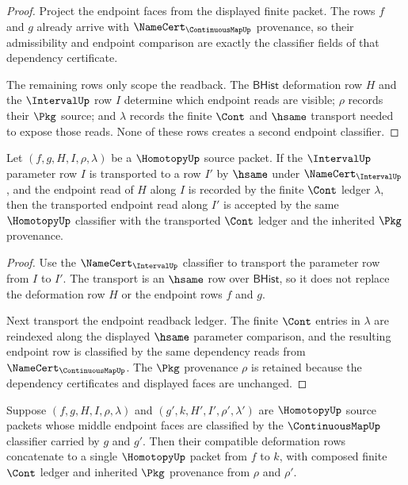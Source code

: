 \begin{proof}
Project the endpoint faces from the displayed finite packet. The rows $f$ and
$g$ already arrive with $\NameCert_{\ContinuousMapUp}$ provenance, so their
admissibility and endpoint comparison are exactly the classifier fields of
that dependency certificate.

The remaining rows only scope the readback. The $\mathsf{BHist}$ deformation
row $H$ and the $\IntervalUp$ row $I$ determine which endpoint reads are
visible; $\rho$ records their $\Pkg$ source; and $\lambda$ records the finite
$\Cont$ and $\hsame$ transport needed to expose those reads. None of these
rows creates a second endpoint classifier.
\end{proof}

\begin{theorem}
\label{thm:homotopy-interval-parameter-transport}
Let $(f,g,H,I,\rho,\lambda)$ be a $\HomotopyUp$ source packet. If the
$\IntervalUp$ parameter row $I$ is transported to a row $I'$ by $\hsame$ under
$\NameCert_{\IntervalUp}$, and the endpoint read of $H$ along $I$ is recorded
by the finite $\Cont$ ledger $\lambda$, then the transported endpoint read
along $I'$ is accepted by the same $\HomotopyUp$ classifier with the
transported $\Cont$ ledger and the inherited $\Pkg$ provenance.
\end{theorem}

\begin{proof}
Use the $\NameCert_{\IntervalUp}$ classifier to transport the parameter row
from $I$ to $I'$. The transport is an $\hsame$ row over $\mathsf{BHist}$, so it
does not replace the deformation row $H$ or the endpoint rows $f$ and $g$.

Next transport the endpoint readback ledger. The finite $\Cont$ entries in
$\lambda$ are reindexed along the displayed $\hsame$ parameter comparison,
and the resulting endpoint row is classified by the same dependency reads
from $\NameCert_{\ContinuousMapUp}$. The $\Pkg$ provenance $\rho$ is retained
because the dependency certificates and displayed faces are unchanged.
\end{proof}

\begin{theorem}
\label{thm:homotopy-deformation-composition-row}
Suppose $(f,g,H,I,\rho,\lambda)$ and $(g',k,H',I',\rho',\lambda')$ are
$\HomotopyUp$ source packets whose middle endpoint faces are classified by the
$\ContinuousMapUp$ classifier carried by $g$ and $g'$. Then their compatible
deformation rows concatenate to a single $\HomotopyUp$ packet from $f$ to $k$,
with composed finite $\Cont$ ledger and inherited $\Pkg$ provenance from
$\rho$ and $\rho'$.
\end{theorem}

